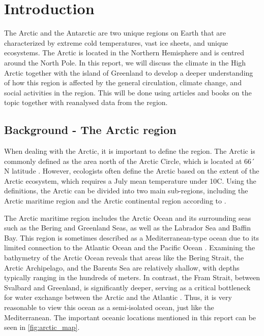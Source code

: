 \section{Introduction}
The Arctic and the Antarctic are two unique regions on Earth that are characterized by extreme cold temperatures, vast ice sheets, and unique ecosystems. The Arctic is located in the Northern Hemisphere and is centred around the North Pole. In this report, we will discuss the climate in the High Arctic together with the island of Greenland to develop a deeper understanding of how this region is affected by the general circulation, climate change, and social activities in the region. This will be done using articles and books on the topic together with reanalysed data from the region.

\subsection{Background - The Arctic region}
When dealing with the Arctic, it is important to define the region. The Arctic is commonly defined as the area north of the Arctic Circle, which is located at 66´ N latitude \citep{nationalSnowandIceDataCenter,serreze2014}. However, ecologists often define the Arctic based on the extent of the Arctic ecosystem, which requires a July mean temperature under 10\degr C. Using the definitions, the Arctic can be divided into two main sub-regions, including the Arctic maritime region and the Arctic continental region according to \citet{nationalSnowandIceDataCenter}. 

The Arctic maritime region includes the Arctic Ocean and its surrounding seas such as the Bering and Greenland Seas, as well as the Labrador Sea and Baffin Bay. This region is sometimes described as a Mediterranean-type ocean due to its limited connection to the Atlantic Ocean and the Pacific Ocean \citep{danilov2000}. Examining the bathymetry of the Arctic Ocean reveals that areas like the Bering Strait, the Arctic Archipelago, and the Barents Sea are relatively shallow, with depths typically ranging in the hundreds of meters. In contrast, the Fram Strait, between Svalbard and Greenland, is significantly deeper, serving as a critical bottleneck for water exchange between the Arctic and the Atlantic \citep{jakobsson2003}. Thus, it is very reasonable to view this ocean as a semi-isolated ocean, just like the Mediterranean. The important oceanic locations mentioned in this report can be seen in \autoref{fig:arctic_map}.

